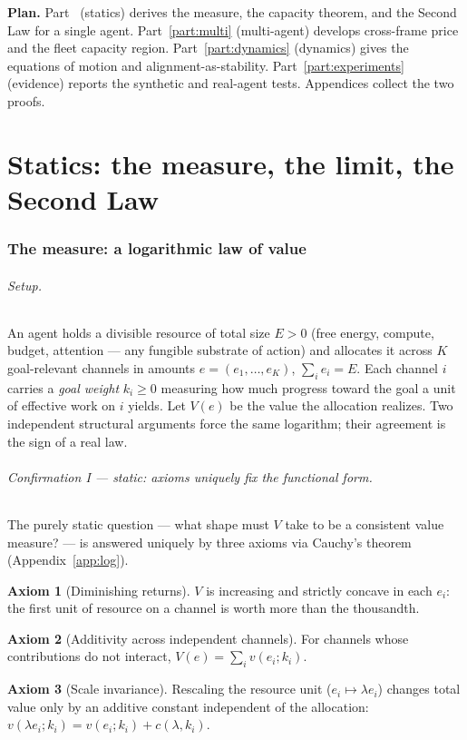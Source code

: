 \documentclass[11pt]{article}
\theoremstyle{plain}
\theoremstyle{definition}
\newtheorem{axiom}{Axiom}
\theoremstyle{remark}
\begin{document}
\bigskip
\noindent\textbf{Plan.} Part~\ref{part:statics} (statics) derives the measure, the capacity theorem, and the
Second Law for a single agent. Part~\ref{part:multi} (multi-agent) develops cross-frame price and the fleet
capacity region. Part~\ref{part:dynamics} (dynamics) gives the equations of motion and alignment-as-stability.
Part~\ref{part:experiments} (evidence) reports the synthetic and real-agent tests. Appendices collect the two
proofs.

\part{Statics: the measure, the limit, the Second Law}\label{part:statics}

\section{The measure: a logarithmic law of value}\label{sec:measure}

\paragraph{Setup.} An agent holds a divisible resource of total size $E>0$ (free energy, compute, budget,
attention --- any fungible substrate of action) and allocates it across $K$ goal-relevant channels in amounts
$e=(e_1,\dots,e_K)$, $\sum_i e_i=E$. Each channel $i$ carries a \emph{goal weight} $k_i\ge 0$ measuring how much
progress toward the goal a unit of effective work on $i$ yields. Let $V(e)$ be the value the allocation
realizes. Two independent structural arguments force the same logarithm; their agreement is the sign of a real law.

\paragraph{Confirmation I --- static: axioms uniquely fix the functional form.}
The purely static question --- what shape must $V$ take to be a consistent value measure? --- is answered
uniquely by three axioms via Cauchy's theorem (Appendix~\ref{app:log}).

\begin{axiom}[Diminishing returns]\label{ax:concave}
$V$ is increasing and strictly concave in each $e_i$: the first unit of resource on a channel is worth more than
the thousandth.
\end{axiom}
\begin{axiom}[Additivity across independent channels]\label{ax:additive}
For channels whose contributions do not interact, $V(e)=\sum_i v(e_i;k_i)$.
\end{axiom}
\begin{axiom}[Scale invariance]\label{ax:scale}
Rescaling the resource unit ($e_i\mapsto \lambda e_i$) changes total value only by an additive constant
independent of the allocation: $v(\lambda e_i;k_i)=v(e_i;k_i)+c(\lambda,k_i)$.
\end{axiom}
\end{document}
